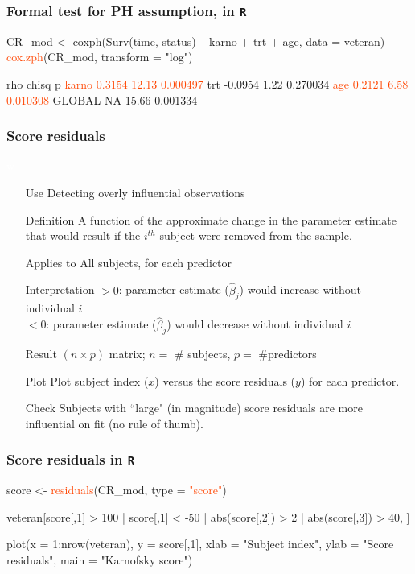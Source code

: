\begin{frame}[fragile]
\frametitle{Formal test for PH assumption, in \texttt{R}}
\begin{Rcode}{0.0}
CR_mod <- coxph(Surv(time, status) ~ karno + trt + age,
                data = veteran)
\textcolor{OrangeRed}{cox.zph}(CR_mod, transform = "log")
\end{Rcode}
\begin{Rout}{0.45}
           rho chisq        p
\textcolor{OrangeRed}{karno   0.3154 12.13 0.000497}
trt    -0.0954  1.22 0.270034
\textcolor{OrangeRed}{age     0.2121  6.58 0.010308}
GLOBAL      NA 15.66 0.001334
\end{Rout}
\end{frame}

\begin{frame}
\frametitle{Score residuals}
\hspace*{-0.3in}
\begin{minipage}{0.12\textwidth}
\textcolor{white}{w}
\end{minipage}
\begin{minipage}{0.91\textwidth}
\small{
\begin{itemize}
\item[Use] Detecting overly influential observations
\item[Definition] A function of the approximate change in the parameter estimate that would result if the $i^{th}$ subject were removed from the sample.
\item[Applies to] All subjects, for each predictor
\item[Interpretation] $>0$: parameter estimate ($\hat{\beta}_j$) would increase without individual $i$ \\
                      $<0$: parameter estimate ($\hat{\beta}_j$) would decrease without individual $i$
\item[Result] $(n\times p)$ matrix; $n=$ \# subjects, $p=$ \#predictors
\item[Plot] Plot subject index ($x$) versus the score residuals ($y$) for each predictor.
\item[Check] Subjects with ``large" (in magnitude) score residuals are more influential on fit (no rule of thumb).
\end{itemize}}
\end{minipage}
\end{frame}


\begin{frame}[fragile]
\frametitle{Score  residuals in \texttt{R}}
\begin{Rcode}{-0.06}
score <- \textcolor{OrangeRed}{residuals}(CR_mod, type = \textcolor{OrangeRed}{"score"})

veteran[score[,1] > 100 |
        score[,1] < -50 |
        abs(score[,2]) > 2 |
        abs(score[,3]) > 40, ]

plot(x = 1:nrow(veteran),
     y = score[,1],
     xlab = "Subject index",
     ylab = "Score residuals",
     main = "Karnofsky score")
\end{Rcode}
\end{frame}

